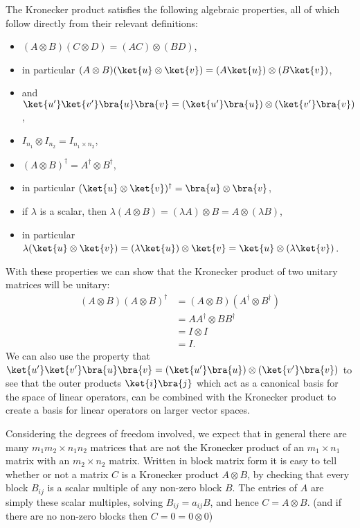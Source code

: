 The Kronecker product satisfies the following algebraic properties, all of which follow directly from their relevant definitions:
\begin{itemize}
	\item $(A\otimes B)(C \otimes D) = (AC) \otimes (BD)$,
	\item in particular $(A\otimes B)(\ket{u} \otimes \ket{v}) = (A\ket{u})\otimes (B\ket{v})$,
	\item and $\ket{u'}\ket{v'}\bra{u}\bra{v} = (\ket{u'}\bra{u})\otimes(\ket{v'}\bra{v})$,
	\item $I_{n_1} \otimes I_{n_2} = I_{n_1\times n_2}$,
	\item $(A\otimes B)^\dagger = A^\dagger \otimes B^\dagger$,
	\item in particular $(\ket{u}\otimes \ket{v})^\dagger = \bra{u} \otimes \bra{v}$,
	\item if $\lambda$ is a scalar, then $\lambda (A \otimes B) = (\lambda A) \otimes B = A \otimes (\lambda B)$,
	\item in particular $\lambda (\ket{u} \otimes \ket{v}) = (\lambda \ket{u}) \otimes \ket{v} = \ket{u} \otimes (\lambda \ket{v})$.
\end{itemize}
With these properties we can show that the Kronecker product of two unitary matrices will be unitary:
\begin{align*}
	(A \otimes B)(A \otimes B)^\dagger
	&= (A \otimes B)(A^\dagger \otimes B^\dagger)
	\\&= AA^\dagger \otimes BB^\dagger
	\\&= I \otimes I
	\\&= I.
\end{align*}
We can also use the property that $\ket{u'}\ket{v'}\bra{u}\bra{v} = (\ket{u'}\bra{u})\otimes(\ket{v'}\bra{v})$ to see that the outer products $\ket{i}\bra{j}$ which act as a canonical basis for the space of linear operators, can be combined with the Kronecker product to create a basis for linear operators on larger vector spaces.

Considering the degrees of freedom involved, we expect that in general there are many $m_1m_2 \times n_1n_2$ matrices that are not the Kronecker product of an $m_1 \times n_1$ matrix with an $m_2 \times n_2$ matrix. Written in block matrix form it is easy to tell whether or not a matrix $C$ is a Kronecker product $A \otimes B$, by checking that every block $B_{ij}$ is a scalar multiple of any non-zero block $B$. The entries of $A$ are simply these scalar multiples, solving $B_{ij} = a_{ij}B$, and hence $C = A \otimes B$. (and if there are no non-zero blocks then $C = 0 = 0 \otimes 0$)
